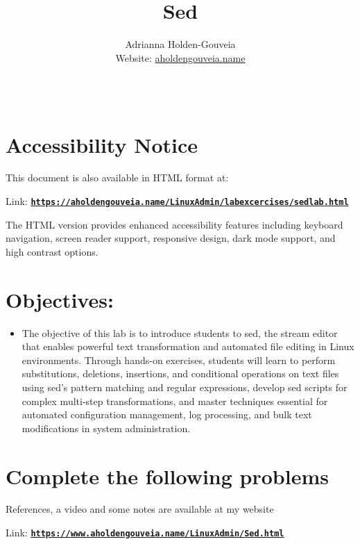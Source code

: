 \documentclass[12pt]{article}
\title{Sed}
\author{
        Adrianna Holden-Gouveia \\
        Website: \href{https://aholdengouveia.name}{aholdengouveia.name}\\ 
        \date{\vspace{-5ex}}
        \faGithub {: aholdengouveia} \\
        }
\begin{document}
    

\maketitle



\section*{Accessibility Notice}
This document is also available in HTML format at:

Link: \href{https://aholdengouveia.name/LinuxAdmin/labexcercises/sedlab.html}{\textbf{\nolinkurl{https://aholdengouveia.name/LinuxAdmin/labexcercises/sedlab.html}}}

The HTML version provides enhanced accessibility features including keyboard navigation, screen reader support, responsive design, dark mode support, and high contrast options.

\section*{Objectives:}
\begin{itemize}
    \item The objective of this lab is to introduce students to sed, the stream editor that enables powerful text transformation and automated file editing in Linux environments. Through hands-on exercises, students will learn to perform substitutions, deletions, insertions, and conditional operations on text files using sed's pattern matching and regular expressions, develop sed scripts for complex multi-step transformations, and master techniques essential for automated configuration management, log processing, and bulk text modifications in system administration.
\end{itemize}
\section*{Complete the following problems}

References, a video and some notes are available at my website

Link: \href{https://www.aholdengouveia.name/LinuxAdmin/Sed.html}{\textbf{\nolinkurl{https://www.aholdengouveia.name/LinuxAdmin/Sed.html}}}
\end{document}
